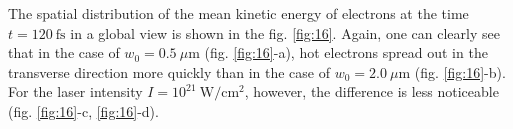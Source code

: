 The spatial distribution of the mean kinetic energy of electrons at the time $ t = 120 \ \mathrm{fs} $ in a global view is shown in the fig. \ref{fig:16}. Again, one can clearly see that in the case of $ w_0 = 0.5 \ \mu\mathrm{m} $ (fig. \ref{fig:16}-a), hot electrons spread out in the transverse direction more quickly than in the case of $ w_0 = 2.0 \ \mu\mathrm{m} $ (fig. \ref{fig:16}-b). For the laser intensity $ I = 10^{21} \ \mathrm{W/cm^2} $, however, the difference is less noticeable (fig. \ref{fig:16}-c, \ref{fig:16}-d).

\begin{figure}[h!]
	\centering
	\hspace{1mm}
	\\

\end{figure}

